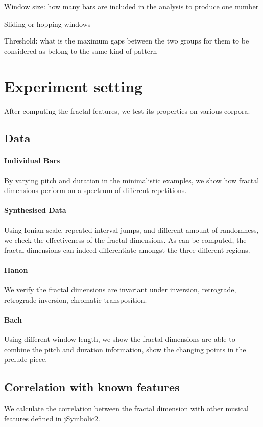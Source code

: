 \documentclass[acmsmall,10pt]{acmart}%
\begin{document}
Window size: how many bars are included in the analysis to produce one number

Sliding or hopping windows

Threshold: what is the maximum gaps between the two groups for them to be considered as belong to the same kind of pattern


\section{Experiment setting}
After computing the fractal features, we test its properties on various corpora.
\subsection{Data}
\paragraph{Individual Bars}
By varying pitch and duration in the minimalistic examples, we show how fractal
dimensions perform on a spectrum of different repetitions.

\paragraph{Synthesised Data}
Using Ionian scale, repeated interval jumps, and different amount of randomness, we check the effectiveness of the fractal dimensions. As can be computed, the fractal dimensions can indeed differentiate amongst the three different regions.
\paragraph{Hanon}
We verify the fractal dimensions are invariant under inversion, retrograde,
retrograde-inversion, chromatic transposition.

\paragraph{Bach}
Using different window length, we show the fractal dimensions are able to
combine the pitch and duration information, show the changing points in the
prelude piece.

\subsection{Correlation with known features}
We calculate the correlation between the fractal dimension with other musical
features defined in jSymbolic2. 
\end{document}
